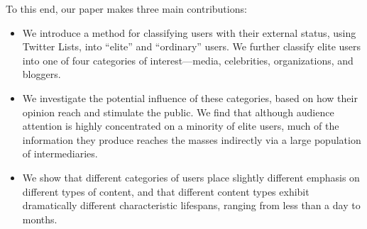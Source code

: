 \documentclass[phd,tocprelim]{cornell}
\begin{document}
To this end, our paper makes three main contributions:
\begin{itemize}
\item We introduce a method for classifying users with their external status, using Twitter
  Lists, into ``elite'' and ``ordinary'' users. We further classify elite users into one of four categories of interest---media,
  celebrities, organizations, and bloggers.
\item We investigate the potential influence of these categories, based on how their opinion reach and stimulate the public. We find that although audience attention is highly concentrated on a
  minority of elite users, much of the information they produce
  reaches the masses indirectly via a large population of
  intermediaries. %
\item We show that different categories of users place slightly
  different emphasis on different types of content, and that different
  content types exhibit dramatically different characteristic
  lifespans, ranging from less than a day to months.
\end{itemize}






\end{document}
